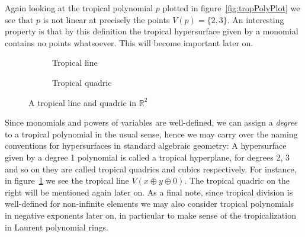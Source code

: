 \documentclass[
  paper=a4,
  titlepage,
  bibliography=totoc,
  listof=totoc,
  pagesize=pdftex
]{scrartcl}
\numberwithin{figure}{section}
\numberwithin{equation}{section}
\numberwithin{table}{section}
\newcommand*\setR{\mathds{R}}
\theoremstyle{definition}
\numberwithin{definition}{section}
\begin{document}
Again looking at the tropical polynomial $p$ plotted in figure~\ref{fig:tropPolyPlot} we
see that $p$ is not linear at precisely the points $V(p) = \{ 2, 3 \}$. An interesting
property is that by this definition the tropical hypersurface given by a monomial contains
no points whatsoever. This will become important later on.

\begin{figure}[tbh]
  \centering
  \begin{subfigure}{0.49\textwidth}
    \centering
    \caption{Tropical line}
    \label{fig:trop:line}
  \end{subfigure}
  \begin{subfigure}{0.49\textwidth}
    \centering
    \caption{Tropical quadric}
    \label{fig:trop:quad}
  \end{subfigure}
  \caption{A tropical line and quadric in $\setR^2$}
  \label{fig:tropLineQuad}
\end{figure}

Since monomials and powers of variables are well-defined, we can assign a \emph{degree} to
a tropical polynomial in the usual sense, hence we may carry over the naming conventions
for hypersurfaces in standard algebraic geometry: A hypersurface given by a degree 1
polynomial is called a tropical hyperplane, for degrees 2, 3 and so on they are called
tropical quadrics and cubics respectively. For instance, in
figure~\ref{fig:trop:line} we see the tropical line $V(x \oplus y
\oplus 0)$. The tropical quadric on the right will be mentioned again later on. As a final
note, since tropical division is well-defined for non-infinite elements we may also
consider tropical polynomials in negative exponents later on, in particular to make sense
of the tropicalization in Laurent polynomial rings.
\end{document}
